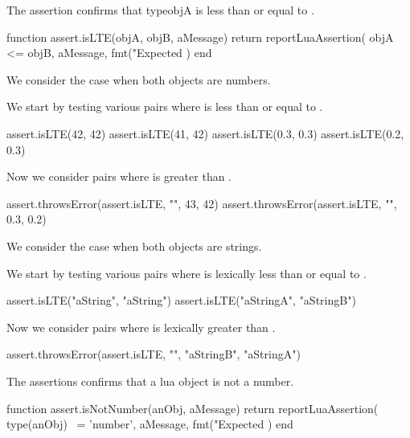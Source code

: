 \stopTestSuite


The  assertion confirms that type{objA} is less than or 
equal to . 

\startLuaCode
function assert.isLTE(objA, objB, aMessage)
  return reportLuaAssertion(
    objA <= objB,
    aMessage,
    fmt("Expected %
  )
end
\stopLuaCode



We consider the case when both objects are numbers. 

We start by testing various pairs where  is less than or equal 
to . 

\startLuaTest
  assert.isLTE(42, 42)
  assert.isLTE(41, 42)
  assert.isLTE(0.3, 0.3)
  assert.isLTE(0.2, 0.3)
\stopLuaTest

Now we consider pairs where  is greater than . 

\startLuaTest
  assert.throwsError(assert.isLTE, "", 43, 42)
  assert.throwsError(assert.isLTE, "", 0.3, 0.2)
\stopLuaTest
\stopTestCase


We consider the case when both objects are strings.

We start by testing various pairs where  is lexically less than 
or equal to . 

\startLuaTest
  assert.isLTE("aString", "aString")
  assert.isLTE("aStringA", "aStringB")
\stopLuaTest

Now we consider pairs where  is lexically greater than 
. 

\startLuaTest
  assert.throwsError(assert.isLTE, "", "aStringB", "aStringA")
\stopLuaTest

\stopTestCase

\stopTestSuite


The  assertions confirms that a lua object is not 
a number. 

\startLuaCode
function assert.isNotNumber(anObj, aMessage)
  return reportLuaAssertion(
    type(anObj) ~= 'number',
    aMessage,
    fmt("Expected %
  )
end
\stopLuaCode


